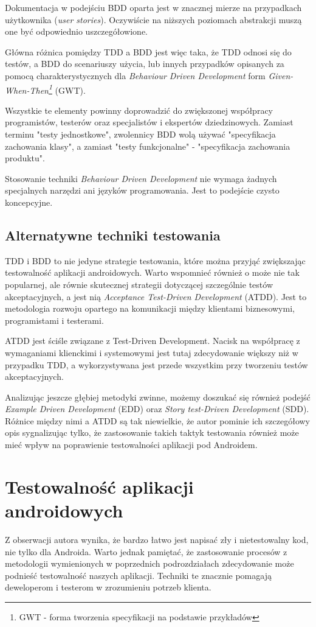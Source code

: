Dokumentacja w podejściu BDD oparta jest w znacznej mierze na przypadkach użytkownika (\textit{user stories}). Oczywiście na niższych poziomach abstrakcji muszą one być odpowiednio uszczegółowione.

Główna różnica pomiędzy TDD a BDD jest więc taka, że TDD odnosi się do testów, a BDD do scenariuszy użycia, lub innych przypadków opisanych za pomocą charakterystycznych dla \textit{Behaviour Driven Development} form \textit{Given-When-Then\footnote{GWT - forma tworzenia specyfikacji na podstawie przykładów}} (GWT).

Wszystkie te elementy powinny doprowadzić do zwiększonej współpracy programistów, testerów oraz specjalistów i ekspertów dziedzinowych. Zamiast terminu "testy jednostkowe", zwolennicy BDD wolą używać "specyfikacja zachowania klasy", a zamiast "testy funkcjonalne" - "specyfikacja zachowania produktu".

Stosowanie techniki \textit{Behaviour Driven Development} nie wymaga żadnych specjalnych narzędzi ani języków programowania. Jest to podejście czysto koncepcyjne.\cite{website:agile:guide}

\subsection{Alternatywne techniki testowania}
\label{alternatywne_metody_testowania}
TDD i BDD to nie jedyne strategie testowania, które można przyjąć zwiększając testowalność aplikacji androidowych. Warto wspomnieć również o może nie tak popularnej, ale równie skutecznej strategii dotyczącej szczególnie testów akceptacyjnych, a jest nią \textit{Acceptance Test-Driven Development} (ATDD). Jest to metodologia rozwoju opartego na komunikacji między klientami biznesowymi, programistami i testerami. 

ATDD jest ściśle związane z Test-Driven Development. Nacisk na współpracę z wymaganiami klienckimi i systemowymi jest tutaj zdecydowanie większy niż w przypadku TDD, a wykorzystywana jest przede wszystkim przy tworzeniu testów akceptacyjnych.

Analizując jeszcze głębiej metodyki zwinne, możemy doszukać się również podejść \textit{Example Driven Development} (EDD) oraz \textit{Story test-Driven Development} (SDD). Różnice między nimi a ATDD są tak niewielkie, że autor pominie ich szczegółowy opis sygnalizując tylko, że zastosowanie takich taktyk testowania również może mieć wpływ na poprawienie testowalności aplikacji pod Androidem.  

\section{Testowalność aplikacji androidowych}
Z obserwacji autora wynika, że bardzo łatwo jest napisać zły i nietestowalny kod, nie tylko dla Androida. Warto jednak pamiętać, że zastosowanie procesów z metodologii wymienionych w poprzednich podrozdziałach zdecydowanie może podnieść testowalność naszych aplikacji. Techniki te znacznie pomagają deweloperom i testerom w zrozumieniu potrzeb klienta.

